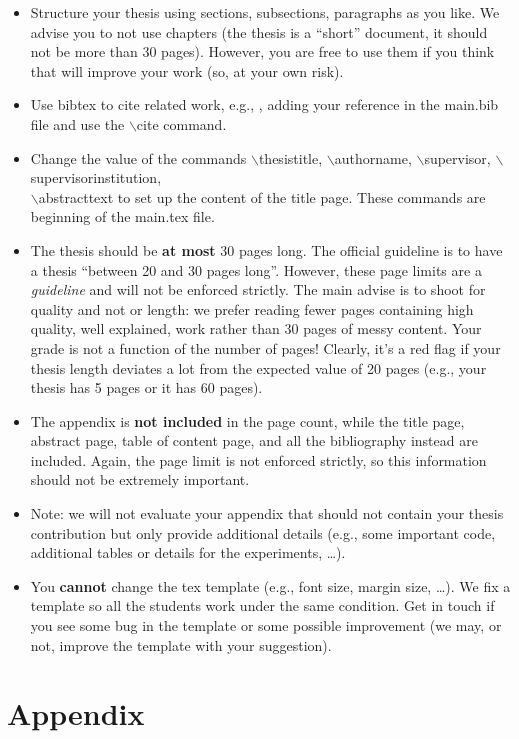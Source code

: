 \documentclass[oneside, a4paper, onecolumn, 11pt]{article}
\begin{document}
\begin{itemize}
    \item Structure your thesis using sections, subsections, paragraphs as you like. We advise you to not use chapters (the thesis is a ``short'' document, it should not be more than 30 pages). However, you are free to use them if you think that will improve your work (so, at your own risk).
    \item Use bibtex to cite related work, e.g., \cite{DBLP:journals/x/Turing37}, adding your reference in the {main.bib} file and use the {$\backslash$cite} command.
    \item Change the value of the commands {$\backslash$thesistitle}, {$\backslash$authorname}, {$\backslash$supervisor}, {$\backslash$supervisorinstitution}, \\ {$\backslash$abstracttext} to set up the content of the title page. These commands are beginning of the {main.tex} file.
    \item The thesis should be \textbf{at most} 30 pages long. The official guideline is to have a thesis ``between 20 and 30 pages long''. However, these page limits are a \emph{guideline} and will not be enforced strictly.
          The main advise is to shoot for quality and not or length: we prefer reading fewer pages containing high quality, well explained, work rather than 30 pages of messy content. Your grade is not a function of the number of pages!
          Clearly, it's a red flag if your thesis length deviates a lot from the expected value of 20 pages (e.g., your thesis has 5 pages or it has 60 pages).
    \item The appendix is \textbf{not included} in the page count, while the title page, abstract page, table of content page, and all the bibliography instead are included. Again, the page limit is not enforced strictly, so this information should not be extremely important.
    \item Note: we will not evaluate your appendix that should not contain your thesis contribution but only provide additional details (e.g., some important code, additional tables or details for the experiments, \ldots).
    \item You \textbf{cannot} change the tex template (e.g., font size, margin size, \ldots). We fix a template so all the students work under the same condition. Get in touch if you see some bug in the template or some possible improvement (we may, or not, improve the template with your suggestion).
\end{itemize}

\newpage



\newpage
\appendix

\section{Appendix}
\label{sec:appendix}
\end{document}
